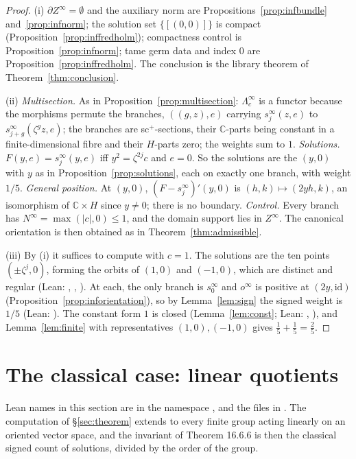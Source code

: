 \documentclass[11pt,a4paper]{article}
\theoremstyle{plain}
\theoremstyle{definition}
\theoremstyle{remark}
\newcommand{\C}{\mathbb{C}}
\newcommand{\abs}[1]{\lvert #1\rvert}
\newcommand{\id}{\mathrm{id}}
\begin{document}
\begin{proof}
(i) $\partial Z^\infty=\emptyset$ and the auxiliary norm are Propositions~\ref{prop:infbundle}
and~\ref{prop:infnorm}; the solution set $\{[(0,0)]\}$ is compact (Proposition~\ref{prop:inffredholm});
compactness control is Proposition~\ref{prop:infnorm}; tame germ data and index $0$ are
Proposition~\ref{prop:inffredholm}. The conclusion is the library theorem of
Theorem~\ref{thm:conclusion}.

(ii) \emph{Multisection.} As in Proposition~\ref{prop:multisection}: $\Lambda^\infty_c$ is a functor
because the morphisms permute the branches, $((g,z),e)$ carrying $s^\infty_j(z,e)$ to
$s^\infty_{j+g}(\zeta^gz,e)$; the branches are sc$^+$-sections, their $\C$-parts being constant in a
finite-dimensional fibre and their $H$-parts zero; the weights sum to $1$.
\emph{Solutions.} $F(y,e)=s^\infty_j(y,e)$ iff $y^2=\zeta^{2j}c$ and $e=0$. So the solutions are the
$(y,0)$ with $y$ as in Proposition~\ref{prop:solutions}, each on exactly one branch, with weight $1/5$.
\emph{General position.} At $(y,0)$, $(F-s^\infty_j)'(y,0)$ is $(h,k)\mapsto(2yh,k)$, an isomorphism of
$\C\times H$ since $y\neq0$; there is no boundary. \emph{Control.} Every branch has
$N^\infty=\max(\abs c,0)\le1$, and the domain support lies in $Z^\infty$. The canonical orientation is
then obtained as in Theorem~\ref{thm:admissible}.

(iii) By (i) it suffices to compute with $c=1$. The solutions are the ten points $(\pm\zeta^j,0)$,
forming the orbits of $(1,0)$ and $(-1,0)$, which are distinct and regular (Lean:
, , ). At each, the only branch is
$s^\infty_0$ and $o^\infty$ is positive at $(2y,\id)$ (Proposition~\ref{prop:inforientation}), so by
Lemma~\ref{lem:sign} the signed weight is $1/5$ (Lean: ). The constant
form $1$ is closed (Lemma~\ref{lem:const}; Lean: , ), and
Lemma~\ref{lem:finite} with representatives $(1,0),(-1,0)$ gives $\frac15+\frac15=\frac25$.
\end{proof}

\section{The classical case: linear quotients}\label{sec:classical}

Lean names in this section are in the namespace , and the files in
. The computation of \S\ref{sec:theorem} extends to every finite group acting linearly on an oriented
vector space, and the invariant of Theorem 16.6.6 is then the classical signed count of solutions,
divided by the order of the group.
\end{document}
